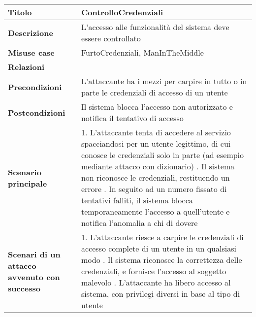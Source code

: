\begin{tabular} {|P{4cm}|P{11.5cm}|}
  \hline
  \textbf{Titolo}                                      & ControlloCredenziali                                            \\
  \hline
  \textbf{Descrizione}                                 & L'accesso alle funzionalità del sistema deve essere controllato \\
  \hline
  \textbf{Misuse case}                                 & FurtoCredenziali, ManInTheMiddle                                \\
  \hline
  \textbf{Relazioni}                                   &                                                                 \\
  \hline
  \textbf{Precondizioni}                               & L'attaccante ha i mezzi per carpire in tutto o in
  parte le credenziali di accesso di un utente                                                                           \\
  \hline
  \textbf{Postcondizioni}                              & Il sistema blocca l'accesso non autorizzato e
  notifica il tentativo di accesso                                                                                       \\
  \hline
  \textbf{Scenario principale}                         & 1. L'attaccante tenta di accedere al servizio
  spacciandosi per un utente legittimo, di cui conosce le credenziali solo in
  parte (ad esempio mediante attacco con dizionario) . Il sistema non
  riconosce le credenziali, restituendo un errore . In seguito ad un numero
  fissato di tentativi falliti, il sistema blocca temporaneamente l'accesso a
  quell'utente e notifica l'anomalia a chi di dovere                                                                     \\
  \hline
  \textbf{Scenari di un attacco avvenuto con successo} & 1. L'attaccante riesce
  a carpire le credenziali di accesso complete di un utente in un qualsiasi
  modo . Il sistema riconosce la correttezza delle credenziali, e fornisce
  l'accesso al soggetto malevolo . L'attaccante ha libero accesso al sistema,
  con privilegi diversi in base al tipo di utente                                                                        \\
  \hline
\end{tabular}
\hfill
\break

